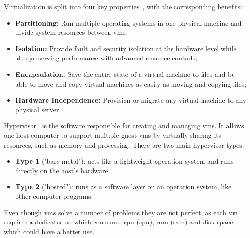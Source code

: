 Virtualization is split into four key properties~\cite{virtualization-key-properties}, with the corresponding benefits:

\begin{itemize}
    \item \textbf{Partitioning:} Run multiple operating systems in one physical machine and divide system resources between \acrlong{vm}s;
    \item \textbf{Isolation:} Provide fault and security isolation at the hardware level while also preserving performance with advanced resource controls;
    \item \textbf{Encapsulation:} Save the entire state of a virtual machine to files and be able to move and copy virtual machines as easily as moving and copying files;
    \item \textbf{Hardware Independence:} Provision or migrate any virtual machine to any physical server.
\end{itemize}

Hypervisor~\cite{hypervisor} is the software responsible for creating and managing \acrshort{vm}s. It allows one host computer to support multiple guest \acrshort{vm}s by virtually sharing its resources, such as memory and processing. There are two main hypervisor types:

\begin{itemize}
    \item \textbf{Type 1} ("bare metal"): acts like a lightweight operation system and runs directly on the host's hardware;
    \item \textbf{Type 2} ("hosted"): runs as a software layer on an operation system, like other computer programs.
\end{itemize}

Even though \acrshort{vm}s solve a number of problems they are not perfect, as each \acrshort{vm} requires a dedicated \acrshort{so} which consumes \acrlong{cpu} (\acrshort{cpu}), \acrlong{ram} (\acrshort{ram}) and disk space, which could have a better use. %


